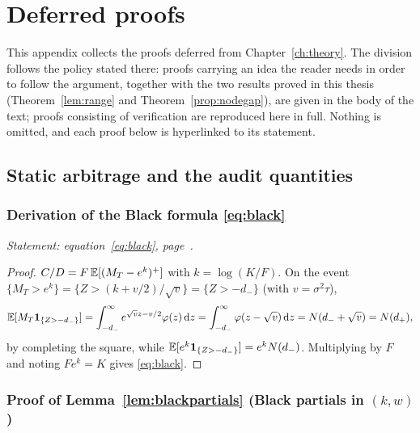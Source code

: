
\chapter{Deferred proofs}\label{app:proofs}

This appendix collects the proofs deferred from Chapter~\ref{ch:theory}. The division follows
the policy stated there: proofs carrying an idea the reader needs in order to follow the
argument, together with the two results proved in this thesis
(Theorem~\ref{lem:range} and Theorem~\ref{prop:nodegap}), are given in the body of the text;
proofs consisting of verification are reproduced here in full. Nothing is omitted, and each
proof below is hyperlinked to its statement.

\section{Static arbitrage and the audit quantities}\label{app:proofs:audit}

\subsection{Derivation of the Black formula \texorpdfstring{\eqref{eq:black}}{(Black)}}
\label{proof:black}

\noindent\emph{Statement: equation~\eqref{eq:black}, page~\pageref{eq:black}.}\medskip

\begin{proof}
$C/D=F\,\mathbb{E}[(M_T-e^{k})^+]$ with $k=\log(K/F)$. On the event
$\{M_T>e^k\}=\{Z>(k+v/2)/\sqrt v\}=\{Z>-d_-\}$ (with $v=\sigma^2\tau$),
\[
\mathbb{E}[M_T\mathbf 1_{\{Z>-d_-\}}]
=\int_{-d_-}^{\infty} e^{\sqrt v z-v/2}\varphi(z)\,\mathrm{d} z
=\int_{-d_-}^{\infty}\varphi(z-\sqrt v)\,\mathrm{d} z
=N(d_-+\sqrt v)=N(d_+),
\]
by completing the square, while $\mathbb{E}[e^k\mathbf 1_{\{Z>-d_-\}}]=e^kN(d_-)$. Multiplying by $F$
and noting $Fe^k=K$ gives \eqref{eq:black}.
\end{proof}

\subsection{Proof of Lemma~\ref{lem:blackpartials} (Black partials in \texorpdfstring{$(k,w)$}{(k,w)})}
\label{proof:blackpartials}

